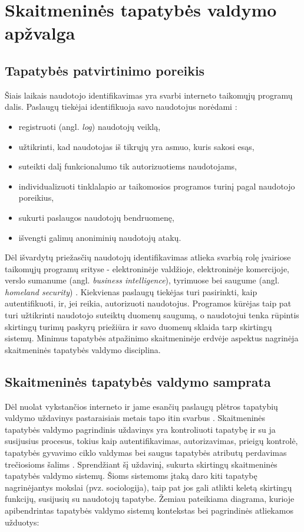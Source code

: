 \section{Skaitmeninės tapatybės valdymo apžvalga}

\subsection{Tapatybės patvirtinimo poreikis}

Šiais laikais naudotojo identifikavimas yra svarbi interneto taikomųjų
programų dalis. Paslaugų tiekėjai identifikuoja savo naudotojus norėdami \cite{RalucaBudiu2014}:

\begin{itemize}
    \item registruoti (angl. \textit{log}) naudotojų veiklą,
    \item užtikrinti, kad naudotojas iš tikrųjų yra asmuo, kuris sakosi esąs,
    \item suteikti dalį funkcionalumo tik autorizuotiems naudotojams,
    \item individualizuoti tinklalapio ar taikomosios programos turinį pagal naudotojo poreikius,
    \item sukurti paslaugos naudotojų bendruomenę,
    \item išvengti galimų anoniminių naudotojų atakų.
\end{itemize}

Dėl išvardytų priežasčių naudotojų identifikavimas atlieka svarbią rolę įvairiose taikomųjų programų
srityse - elektroninėje valdžioje, elektroninėje komercijoje, verslo sumanume
(angl. \textit{business intelligence}), tyrimuose bei saugume
(angl. \textit{homeland security}) \cite{Glasser2009}. Kiekvienas paslaugų tiekėjas turi pasirinkti,
kaip autentifikuoti, ir, jei reikia, autorizuoti naudotojus. Programos kūrėjas taip pat turi užtikrinti naudotojo
suteiktų duomenų saugumą, o naudotojui tenka rūpintis skirtingų turimų
paskyrų priežiūra ir savo duomenų sklaida tarp skirtingų sistemų. Minimus tapatybės atpažinimo
skaitmeninėje erdvėje aspektus nagrinėja skaitmeninės tapatybės valdymo disciplina.

\subsection{Skaitmeninės tapatybės valdymo samprata}

Dėl nuolat vykstančios interneto ir jame esančių paslaugų plėtros tapatybių
valdymo uždavinys pastaraisiais metais tapo itin svarbus \cite{Glasser2009}. Skaitmeninės tapatybės valdymo pagrindinis uždavinys yra kontroliuoti
tapatybę ir su ja susijusius procesus, tokius kaip autentifikavimas, autorizavimas, prieigų kontrolė,
tapatybės gyvavimo ciklo valdymas bei saugus tapatybės atributų perdavimas trečiosioms šalims \cite{Cao2010, Dabrowski2008}. Sprendžiant šį uždavinį,
sukurta skirtingų skaitmeninės tapatybės valdymo sistemų. Šioms sistemoms įtaką daro
kiti tapatybę nagrinėjantys mokslai (pvz. sociologija), taip pat jos gali atlikti keletą skirtingų funkcijų, susijusių
su naudotojų tapatybe. Žemiau pateikiama diagrama,
kurioje apibendrintas tapatybės valdymo sistemų kontekstas bei pagrindinės atliekamos užduotys:


